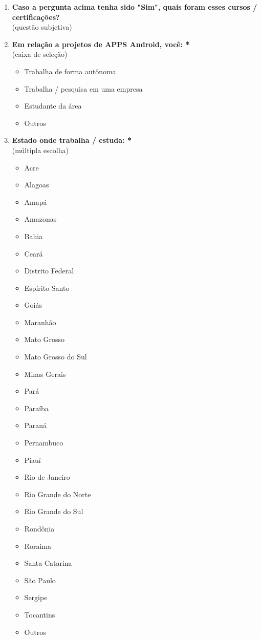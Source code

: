 \begin{enumerate}[label=\bf A\arabic*,leftmargin=1.8cm]
\begin{enumerate}[label= \arabic*]
        \item \textbf{Caso a pergunta acima tenha sido "Sim", quais foram esses cursos / certificações?}\\
        (questão subjetiva)
        
        \item \textbf{Em relação a projetos de \ac{APPS} Android, você: *}\\
        (caixa de seleção)
        \begin{itemize}
            \item Trabalha de forma autônoma
            \item Trabalha / pesquisa em uma empresa
            \item Estudante da área
            \item Outros
        \end{itemize}

        \item \textbf{Estado onde trabalha / estuda: *}\\
        (múltipla escolha)
        \begin{itemize}
            \item Acre
            \item Alagoas
            \item Amapá
            \item Amazonas
            \item Bahia
            \item Ceará
            \item Distrito Federal
            \item Espírito Santo
            \item Goiás
            \item Maranhão
            \item Mato Grosso
            \item Mato Grosso do Sul
            \item Minas Gerais
            \item Pará
            \item Paraíba
            \item Paraná
            \item Pernambuco
            \item Piauí
            \item Rio de Janeiro
            \item Rio Grande do Norte
            \item Rio Grande do Sul
            \item Rondônia
            \item Roraima
            \item Santa Catarina
            \item São Paulo
            \item Sergipe
            \item Tocantins
            \item Outros
        \end{itemize}
        

\end{enumerate}
\end{enumerate}
